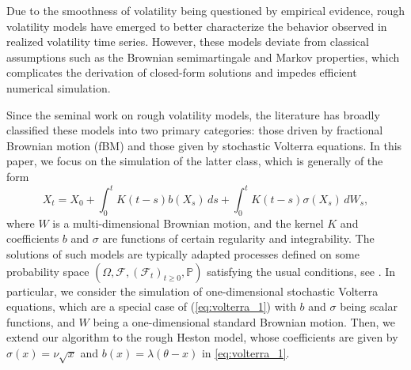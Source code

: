 \documentclass[11pt]{article}%
\theoremstyle{definition}
\begin{document}
Due to the smoothness of volatility being questioned by empirical evidence, rough volatility models have emerged to better characterize the behavior observed in realized volatility time series. However, these models deviate from classical assumptions such as the Brownian semimartingale and Markov properties, which complicates the derivation of closed-form solutions and impedes efficient numerical simulation.

Since the seminal work on rough volatility models, the literature has broadly classified these models into two primary categories: those driven by fractional Brownian motion (fBM) and those given by stochastic Volterra equations. In this paper, we focus on the simulation of the latter class, which is generally of the form
\begin{equation}
X_t = X_0 + \int_0^t K(t-s)b(X_s)\,ds + \int_0^t K(t-s)\sigma(X_s)\, dW_s,\label{eq:volterra_1}
\end{equation}
where \(W\) is a multi-dimensional Brownian motion, and the kernel \(K\) and coefficients \(b\) and \(\sigma\) are functions of certain regularity and integrability. The solutions of such models are typically adapted processes defined on some probability space \((\Omega,\mathcal{F},(\mathcal{F}_t)_{t\ge 0},\mathbb{P})\) satisfying the usual conditions, see \cite{abijaber2018}. In particular, we consider the simulation of one-dimensional stochastic Volterra equations, which are a special case of (\ref{eq:volterra_1}) with \(b\) and \(\sigma\) being scalar functions, and \(W\) being a one-dimensional standard Brownian motion. Then, we extend our algorithm to the rough Heston model, whose coefficients are given by \(\sigma(x) = \nu\sqrt{x}\) and \(b(x) = \lambda(\theta - x)\) in \eqref{eq:volterra_1}. 
\end{document}
